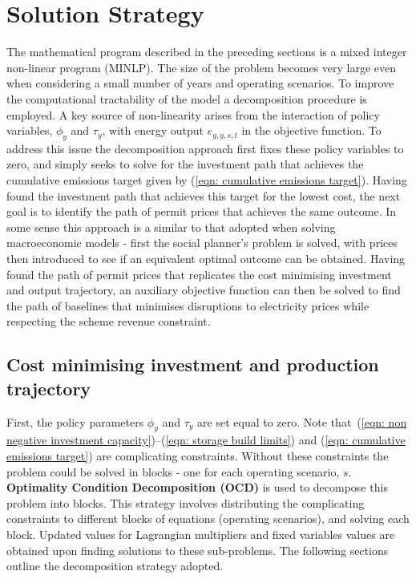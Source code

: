 \documentclass{article}
\newcommand{\iGenerator}{g}
\newcommand{\iYear}{y}
\newcommand{\iScenario}{s}
\newcommand{\iInterval}{t}
\newcommand{\vBaseline}[1][\iYear]{\phi_{#1}}
\newcommand{\vPermitPrice}[1][\iYear]{\tau_{#1}}
\newcommand{\vEnergy}[1][\iGenerator,\iYear,\iScenario,\iInterval]{e_{#1}}
\begin{document}
\section{Solution Strategy}
The mathematical program described in the preceding sections is a mixed integer non-linear program (MINLP). The size of the problem becomes very large even when considering a small number of years and operating scenarios. To improve the computational tractability of the model a decomposition procedure is employed. A key source of non-linearity arises from the interaction of policy variables, $\vBaseline$ and $\vPermitPrice$, with energy output $\vEnergy$ in the objective function. To address this issue the decomposition approach first fixes these policy variables to zero, and simply seeks to solve for the investment path that achieves the cumulative emissions target given by (\ref{eqn: cumulative emissions target}). Having found the investment path that achieves this target for the lowest cost, the next goal is to identify the path of permit prices that achieves the same outcome. In some sense this approach is a similar to that adopted when solving macroeconomic models - first the social planner's problem is solved, with prices then introduced to see if an equivalent optimal outcome can be obtained. Having found the path of permit prices that replicates the cost minimising investment and output trajectory, an auxiliary objective function can then be solved to find the path of baselines that minimises disruptions to electricity prices while respecting the scheme revenue constraint.

\subsection{Cost minimising investment and production trajectory}
First, the policy parameters $\vBaseline$ and $\vPermitPrice$ are set equal to zero. Note that~(\ref{eqn: non negative investment capacity})--(\ref{eqn: storage build limits}) and (\ref{eqn: cumulative emissions target}) are complicating constraints. Without these constraints the problem could be solved in blocks - one for each operating scenario, $\iScenario$. \textbf{Optimality Condition Decomposition (OCD)} is used to decompose this problem into blocks. This strategy involves distributing the complicating constraints to different blocks of equations (operating scenarios), and solving each block. Updated values for Lagrangian multipliers and fixed variables values are obtained upon finding solutions to these sub-problems. The following sections outline the decomposition strategy adopted.
\end{document}
